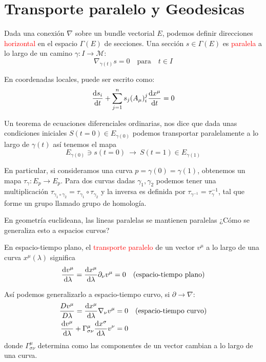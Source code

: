 \documentclass[../main]{subfiles}
\begin{document}
\section{Transporte paralelo y Geodesicas}

Dada una conexión $\nabla$ sobre un bundle vectorial $E$, podemos definir direcciones \textcolor{red}{horizontal} en el espacio $\Gamma(E)$ de secciones. Una sección $s \in \Gamma(E)$ es \textcolor{red}{paralela} a lo largo de un camino $\gamma: I \rightarrow \mathcal{M}$:
\begin{equation}
    \nabla_{\dot{\gamma}(t)}s=0 \quad \text{para} \quad t\in I
\end{equation}

En coordenadas locales, puede ser escrito como:
\begin{equation}
    \dv{s_i}{t}+\sum_{j=1}^n s_j(A_{\mu})^j_i \dv{x^{\mu}}{t}=0
\end{equation}

Un teorema de ecuaciones diferenciales ordinarias, nos dice que dada unas condiciones iniciales $S(t=0) \in E_{\gamma(0)}$ podemos transportar paralelamente a lo largo de $\gamma(t)$ así tenemos el mapa 
\begin{equation}
    E_{\gamma(0)} \ni s(t=0) \ \rightarrow \ S(t=1) \in E_{\gamma(1)}
\end{equation}

En particular, si consideramos una curva $p=\gamma(0)=\gamma(1)$, obtenemos un mapa $\tau_{\gamma}: E_p \rightarrow E_p$. Para dos curvas dadas $\gamma_1, \gamma_2$ podemos tener una multiplicación $\tau_{\gamma_1 \circ \gamma_2}=\tau_{\gamma_1}\circ \tau_{\gamma_2}$ y la inversa es definida por $\tau_{\gamma^{-1}}=\tau^{-1}_{\gamma}$, tal que forme un grupo llamado grupo de homología.

En geometría euclideana, las lineas paralelas se mantienen paralelas ¿Cómo se generaliza esto a espacios curvos?

En espacio-tiempo plano, el \textcolor{red}{transporte paralelo} de un vector $v^{\mu}$ a lo largo de una curva $x^{\mu}(\lambda)$ significa 
\begin{equation}
    \dv{v^{\mu}}{\lambda}=\dv{x^{\mu}}{\lambda}\partial_{\nu}v^{\mu}=0 \quad (\text{espacio-tiempo plano})
\end{equation}

Así podemos generalizarlo a espacio-tiempo curvo, si $\partial \rightarrow \nabla$:
\begin{equation}
    \begin{split}
        \dfrac{D v^{\mu}}{D\lambda}=\dv{x^{\mu}}{\lambda}\nabla_{\nu}v^{\mu}&=0 \quad (\text{espacio-tiempo curvo})\\
        \dv{v^{\mu}}{\lambda}+\Gamma^{\mu}_{\sigma\nu}\dv{x^{\sigma}}{\lambda}v^{\nu}&=0
    \end{split}
\end{equation}
donde $\Gamma^{\mu}_{\sigma\nu}$ determina como las componentes de un vector cambian a lo largo de una curva.
\end{document}
